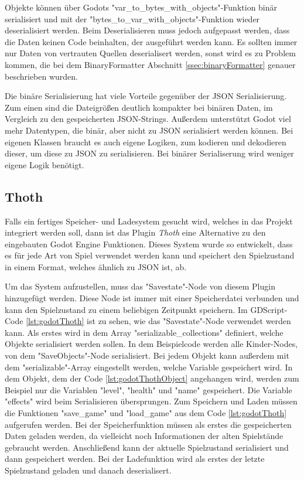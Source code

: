 Objekte können über Godots "var\_to\_bytes\_with\_objects"-Funktion binär serialisiert und mit der "bytes\_to\_var\_with\_objects"-Funktion wieder deserialisiert werden. Beim Deserialisieren muss jedoch aufgepasst werden, dass die Daten keinen Code beinhalten, der ausgeführt werden kann. Es sollten immer nur Daten von vertrauten Quellen deserialisert werden, sonst wird es zu Problem kommen, die bei dem BinaryFormatter Abschnitt \ref{ssec:binaryFormatter} genauer beschrieben wurden.\cite{godotengineGlobalScope}

Die binäre Serialisierung hat viele Vorteile gegenüber der JSON Serialisierung. Zum einen sind die Dateigrößen deutlich kompakter bei binären Daten, im Vergleich zu den gespeicherten JSON-Strings. Außerdem unterstützt Godot viel mehr Datentypen, die binär, aber nicht zu JSON serialisiert werden können. Bei eigenen Klassen braucht es auch eigene Logiken, zum kodieren und dekodieren dieser, um diese zu JSON zu serialisieren. Bei binärer Serialiserung wird weniger eigene Logik benötigt.\cite{godotengineSavingGames}

\subsection{Thoth}
Falls ein fertiges Speicher- und Ladesystem gesucht wird, welches in das Projekt integriert werden soll, dann ist das Plugin \textit{Thoth} eine Alternative zu den eingebauten Godot Engine Funktionen. Dieses System wurde so entwickelt, dass es für jede Art von Spiel verwendet werden kann und speichert den Spielzustand in einem Format, welches ähnlich zu JSON ist, ab.\cite{stupidratstudioGodotSaveLoad}

Um das System aufzustellen, muss das "Savestate"-Node von diesem Plugin hinzugefügt werden. Diese Node ist immer mit einer Speicherdatei verbunden und kann den Spielzustand zu einem beliebigen Zeitpunkt speichern. Im GDScript-Code \ref{lst:godotThoth} ist zu sehen, wie das "Savestate"-Node verwendet werden kann. Als erstes wird in dem Array "serializable\_collections" definiert, welche Objekte serialisiert werden sollen. In dem Beispielcode werden alle Kinder-Nodes, von dem "SaveObjects"-Node serialisiert. Bei jedem Objekt kann außerdem mit dem "serializable"-Array eingestellt werden, welche Variable gespeichert wird. In dem Objekt, dem der Code \ref{lst:godotThothObject} angehangen wird, werden zum Beispiel nur die Variablen "level", "health" und "name" gespeichert. Die Variable "effects" wird beim Serialisieren übersprungen. Zum Speichern und Laden müssen die Funktionen "save\_game" und "load\_game" aus dem Code \ref{lst:godotThoth} aufgerufen werden. Bei der Speicherfunktion müssen als erstes die gespeicherten Daten geladen werden, da vielleicht noch Informationen der alten Spielstände gebraucht werden. Anschließend kann der aktuelle Spielzustand serialisiert und dann gespeichert werden. Bei der Ladefunktion wird als erstes der letzte Spielzustand geladen und danach deserialisert. 

